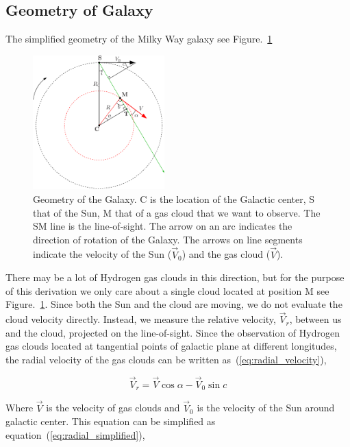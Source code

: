 \documentclass[10pt,conference]{IEEEtran}
\begin{document}
\subsection{Geometry of Galaxy}

The simplified geometry of the Milky Way galaxy\cite{CathyHorellou2015} see Figure.~\ref{fig:galgeo_figure}

\begin{figure}[htbp]
 \includegraphics[width=2.0in]{galgeom}
 \caption{Geometry of the Galaxy. C is the location of the Galactic center, S that of the Sun, M
that of a gas cloud that we want to observe. The SM line is the line-of-sight. The arrow
on an arc indicates the direction of rotation of the Galaxy. The arrows on line segments
indicate the velocity of the Sun ($\vec{V}_0$) and the gas cloud ($\vec{V}$)\cite{CathyHorellou2015}.}
 \label{fig:galgeo_figure}
\end{figure}

There may be a lot of Hydrogen gas clouds in this direction, but for the purpose of this derivation we only care about a single cloud located at position M see Figure.~\ref{fig:galgeo_figure}. Since both the Sun and the cloud are moving, we do not evaluate the cloud velocity directly. Instead, we measure the relative velocity, $\vec{V}_{r}$, between us and the cloud, projected on the line-of-sight\cite{CathyHorellou2015}. Since the observation of Hydrogen gas clouds located at tangential points of galactic plane at different longitudes, the radial velocity of the gas clouds can be written as~(\ref{eq:radial_velocity}),

\begin{equation}
  \vec{V}_{r}=\vec{V}\cos\alpha-\vec{V}_{0}\sin c
  \label{eq:radial_velocity}
\end{equation}

Where $\vec{V}$ is the velocity of gas clouds and $\vec{V}_{0}$ is the velocity of the Sun around galactic center. This equation can be simplified as equation~(\ref{eq:radial_simplified}),
\end{document}
